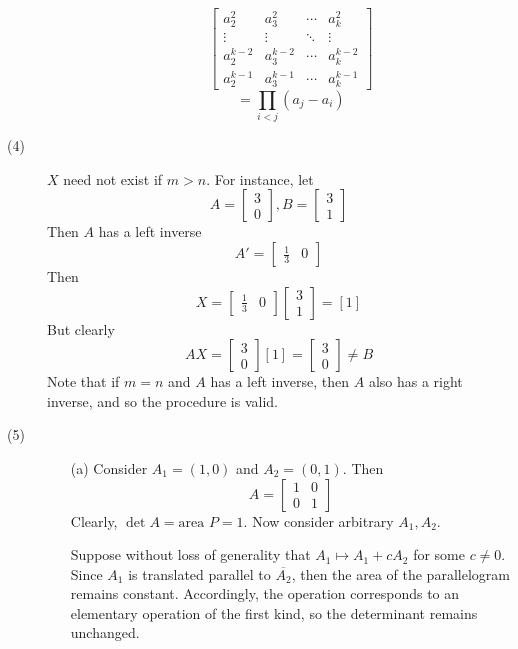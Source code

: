\begin{description}
\begin{itemize}
$$\begin{bmatrix}
a_2^2 & a_3^2 & \cdots & a_k^2 \\
\vdots & \vdots & \ddots & \vdots \\
a_2^{k-2} & a_3^{k-2} & \cdots & a_k^{k-2} \\
a_2^{k-1} & a_3^{k-1} & \cdots & a_k^{k-1}
\end{bmatrix}$$
$$= \prod_{i < j}(a_j - a_i)$$
\end{itemize}
\item[(4)]
$X$ need not exist if $m > n$. For instance, let
$$A = \begin{bmatrix}
3 \\
0
\end{bmatrix}, B = \begin{bmatrix}
3 \\
1
\end{bmatrix}$$
Then $A$ has a left inverse
$$A' = \begin{bmatrix}
\frac{1}{3} & 0
\end{bmatrix}$$
Then
$$X = \begin{bmatrix}
\frac{1}{3} & 0
\end{bmatrix}\begin{bmatrix}
3 \\
1
\end{bmatrix} = [1]$$
But clearly
$$AX = \begin{bmatrix}
3 \\
0
\end{bmatrix}[1] = \begin{bmatrix}
3 \\
0
\end{bmatrix} \neq B$$
Note that if $m = n$ and $A$ has a left inverse, then $A$ also has a right inverse, and so the procedure is valid.
\item[(5)]
\begin{itemize}
\item[(a)]
Consider $A_1 = (1, 0)$ and $A_2 = (0, 1)$. Then
$$A = \begin{bmatrix}
1 & 0 \\
0 & 1
\end{bmatrix}$$
Clearly, $\det A = \text{area } P = 1$. Now consider arbitrary $A_1, A_2$. 

Suppose without loss of generality that $A_1 \mapsto A_1 + cA_2$ for some $c \neq 0$. Since $A_1$ is translated parallel to $\overline{A_2}$, then the area of the parallelogram remains constant. Accordingly, the operation corresponds to an elementary operation of the first kind, so the determinant remains unchanged.


\end{itemize}
\end{description}
